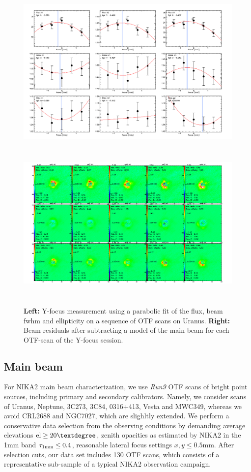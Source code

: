 \begin{figure}[h!]
\centering
\includegraphics[height=8cm]{Figures/plot_20170223s44.png}
\hspace{0.5cm}
\includegraphics[height=8cm]{Figures/residuals_focus_otf_20170223s44.png}
\caption{{\footnotesize \textbf{Left:} Y-focus measurement using a parabolic fit of the flux, beam fwhm and ellipticity on a sequence of OTF scans on Uranus. \textbf{Right:} Beam residuals after subtracting a model of the main beam for each OTF-scan of the Y-focus session.}}
\label{fig:Y_focus}
\end{figure}

\subsection{Main beam}

For NIKA2 main beam characterization, we use \emph{Run9} OTF scans of bright point sources, including primary and secondary calibrators. Namely, we consider scans of Uranus, Neptune, 3C273, 3C84, 0316+413, Vesta and MWC349, whereas we avoid CRL2688 and NGC7027, which are slighltly extended. We perform a conservative data selection from the observing conditions by demanding average elevations $\rm{el} \ge 20°$, zenith opacities as estimated by NIKA2 in the 1mm band $\tau_{1\rm{mm}} \le 0.4$, reasonable lateral focus settings $x, y \le 0.5$mm. After selection cuts, our data set includes 130 OTF scans, which consists of a representative sub-sample of a typical NIKA2 observation campaign.    

